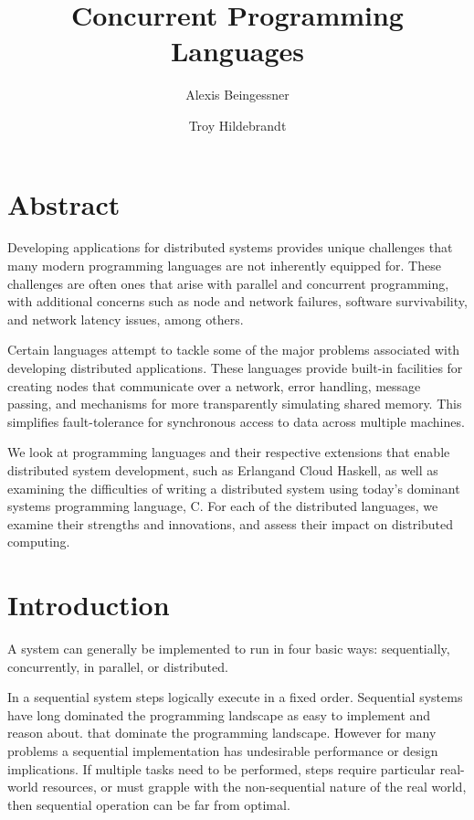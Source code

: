 \documentclass[10pt,a4paper,twocolumn]{article}
\begin{document}
\title{Concurrent Programming Languages}

\author{
Alexis Beingessner
\and
Troy Hildebrandt
}

\maketitle

\section{Abstract}

Developing applications for distributed systems provides unique challenges that
many modern programming languages are not inherently equipped for. These
challenges are often ones that arise with parallel and concurrent programming,
with additional concerns such as node and network failures, software
survivability, and network latency issues, among others.

Certain languages attempt to tackle some of the major problems associated with
developing distributed applications. These languages provide built-in facilities
for creating nodes that communicate over a network, error handling, message
passing, and mechanisms for more transparently simulating shared memory. This
simplifies fault-tolerance for synchronous access to data across multiple
machines.

We look at programming languages and their respective extensions that enable
distributed system development, such as Erlangand Cloud Haskell, as well as
examining the difficulties of writing a distributed system using today's
dominant systems programming language, C. For each of the distributed languages,
we examine their strengths and innovations, and assess their impact on
distributed computing.

\section{Introduction}

A system can generally be implemented to run in four basic ways:
sequentially, concurrently, in parallel, or distributed.

In a sequential system steps logically execute in a fixed order. Sequential
systems have long dominated the programming landscape as easy to implement and
reason about.  that dominate the programming landscape. However for many
problems a sequential implementation has undesirable performance or design
implications. If multiple tasks need to be performed, steps require particular
real-world resources, or must grapple with the non-sequential nature of the real
world, then sequential operation can be far from optimal.
\end{document}
